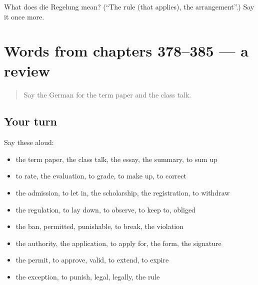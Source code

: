 \begin{tcolorbox}[breakable,colback=teal!4,colframe=teal!35!black,title={Before you move on}]
What does die Regelung mean? (\textquotedblleft{}The rule (that applies), the arrangement\textquotedblright{}.) Say it once more.
\end{tcolorbox}
\section[(dialogue)]{Words from chapters 378–385 — a review}

\label{lesson:GE-R385-review-378-385}



\begin{quote}
Say the German for the term paper and the class talk.
\end{quote}

\subsection*{Your turn}
Say these aloud:

\begin{itemize}
\raggedright
  \item the term paper, the class talk, the essay, the summary, to sum up
  \item to rate, the evaluation, to grade, to make up, to correct
  \item the admission, to let in, the scholarship, the registration, to withdraw
  \item the regulation, to lay down, to observe, to keep to, obliged
  \item the ban, permitted, punishable, to break, the violation
  \item the authority, the application, to apply for, the form, the signature
  \item the permit, to approve, valid, to extend, to expire
  \item the exception, to punish, legal, legally, the rule
\end{itemize}

